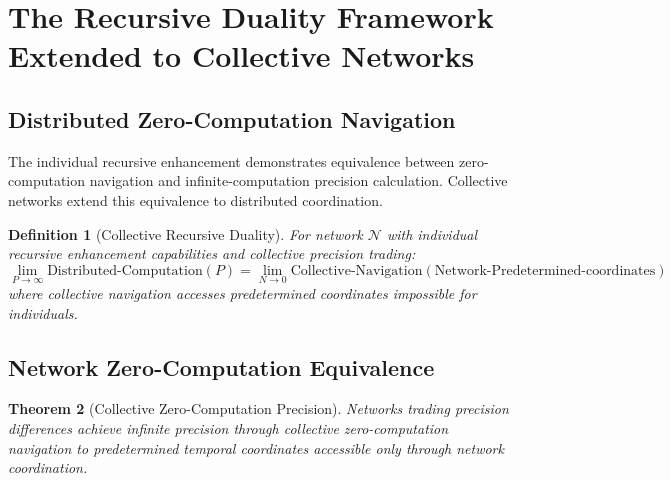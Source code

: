 \documentclass[12pt,a4paper]{article}
\newtheorem{theorem}{Theorem}[section]
\newtheorem{definition}[theorem]{Definition}
\begin{document}
\section{The Recursive Duality Framework Extended to Collective Networks}

\subsection{Distributed Zero-Computation Navigation}

The individual recursive enhancement demonstrates equivalence between zero-computation navigation and infinite-computation precision calculation. Collective networks extend this equivalence to distributed coordination.

\begin{definition}[Collective Recursive Duality]
For network $\mathcal{N}$ with individual recursive enhancement capabilities and collective precision trading:
$$\lim_{P \to \infty} \text{Distributed-Computation}(P) = \lim_{N \to 0} \text{Collective-Navigation}(\text{Network-Predetermined-coordinates})$$
where collective navigation accesses predetermined coordinates impossible for individuals.
\end{definition}

\subsection{Network Zero-Computation Equivalence}

\begin{theorem}[Collective Zero-Computation Precision]
Networks trading precision differences achieve infinite precision through collective zero-computation navigation to predetermined temporal coordinates accessible only through network coordination.
\end{theorem}
\end{document}
